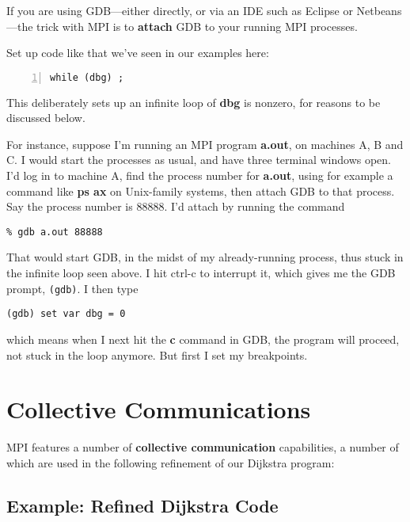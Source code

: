 If you are using GDB---either directly, or via an IDE such as Eclipse or
Netbeans---the trick with MPI is to {\bf attach} GDB to your running MPI
processes.

Set up code like that we've seen in our examples here:

\begin{lstlisting}[numbers=left]
while (dbg) ;
\end{lstlisting}

This deliberately sets up an infinite loop of {\bf dbg} is nonzero, for
reasons to be discussed below.

For instance, suppose I'm running an MPI program {\bf a.out}, on
machines A, B and C.  I would start the processes as usual, and have 
three terminal windows open.  I'd log in to machine A, find the process
number for {\bf a.out}, using for example a command like {\bf ps ax} on
Unix-family systems, then attach GDB to that process.
Say the process number is 88888.  I'd attach by running the command

\begin{lstlisting}
% gdb a.out 88888
\end{lstlisting}

That would start GDB, in the midst of my already-running process, thus
stuck in the infinite loop seen above.  I hit ctrl-c to interrupt it,
which gives me the GDB prompt, \lstinline{(gdb)}.  I then type

\begin{lstlisting}
(gdb) set var dbg = 0
\end{lstlisting}

which means when I next hit the {\bf c} command in GDB, the program will
proceed, not stuck in the loop anymore.  But first I set my breakpoints.

\section{Collective Communications}

MPI features a number of {\bf collective communication} capabilities, a
number of which are used in the following refinement of our Dijkstra
program:

\subsection{Example:  Refined Dijkstra Code}

